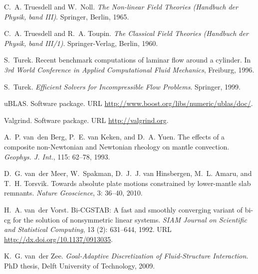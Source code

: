 \begin{thebibliography}{467}
C.~A. Truesdell and W.~Noll.
\newblock \emph{The {N}on-linear {F}ield {T}heories ({H}andbuch der {P}hysik,
  band {I}{I}{I})}.
\newblock Springer, Berlin, 1965.

C.~A. Truesdell and R.~A. Toupin.
\newblock \emph{The {C}lassical {F}ield {T}heories ({H}andbuch der {P}hysik,
  band {I}{I}{I}/1)}.
\newblock Springer-Verlag, Berlin, 1960.

S.~Turek.
\newblock Recent benchmark computations of laminar flow around a cylinder.
\newblock In \emph{3rd World Conference in Applied Computational Fluid
  Mechanics}, Freiburg, 1996.

S.~Turek.
\newblock \emph{Efficient Solvers for Incompressible Flow Problems}.
\newblock Springer, 1999.

uBLAS.
\newblock Software package.
\newblock URL \url{http://www.boost.org/libs/numeric/ublas/doc/}.

Valgrind.
\newblock Software package.
\newblock URL \url{http://valgrind.org}.

A.~P. van~den Berg, P.~E. van Keken, and D.~A. Yuen.
\newblock The effects of a composite non-{N}ewtonian and {N}ewtonian rheology
  on mantle convection.
\newblock \emph{Geophys. J. Int.}, 115: 62--78, 1993.

D.~G. van~der Meer, W.~Spakman, D.~J.~J. van Hinsbergen, M.~L. Amaru, and T.~H.
  Torsvik.
\newblock Towards absolute plate motions constrained by lower-mantle slab
  remnants.
\newblock \emph{Nature Geoscience}, 3: 36--40, 2010.

H.~A. van~der Vorst.
\newblock Bi-{CGSTAB}: A fast and smoothly converging variant of bi-cg for the
  solution of nonsymmetric linear systems.
\newblock \emph{SIAM Journal on Scientific and Statistical Computing},
  13 (2): 631--644, 1992.
\newblock URL \url{http://dx.doi.org/10.1137/0913035}.

K.~G. van~der Zee.
\newblock \emph{Goal-Adaptive Discretization of Fluid-Structure Interaction}.
\newblock PhD thesis, Delft University of Technology, 2009.


\end{thebibliography}
